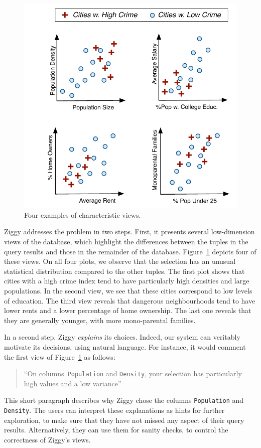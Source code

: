 \begin{figure}[t!]
    \centering
    \includegraphics[width=.9\columnwidth]{Images/CharacViews}
    \caption{Four examples of characteristic views.}
    \label{fig:characteristic-views}
\end{figure}

Ziggy addresses the problem in two steps. First, it presents several
low-dimension views of the database, which highlight the differences between
the tuples in the query results and those in the remainder of the database.
Figure~\ref{fig:characteristic-views} depicts four of these views.  On all four
plots, we observe that the selection has an unusual statistical distribution
compared to the other tuples. The first plot shows that cities with a high
crime index tend to have particularly high densities and large populations. In
the second view, we see that these cities correspond to low levels of
education.  The third view reveals that dangerous neighbourhoods tend to have
lower rents and a lower percentage of home ownership. The last one reveals that
they are generally younger, with more mono-parental families.

In a second step, Ziggy \emph{explains} its choices. Indeed, our system can
veritably motivate its decisions, using natural language. For instance, it
would comment the first view of Figure~\ref{fig:characteristic-views} as
follows:
\begin{quotation}
    ``On columns~\texttt{Population} and \texttt{Density}, your selection has
    particularly high values and a low variance''
\end{quotation} 
This short paragraph describes why Ziggy chose the columns \texttt{Population}
and \texttt{Density}. The users can interpret these explanations as hints for
further exploration, to make sure that they have not missed any 
aspect of their query results. Alternatively, they can use them for sanity
checks, to control the correctness of Ziggy's views.


